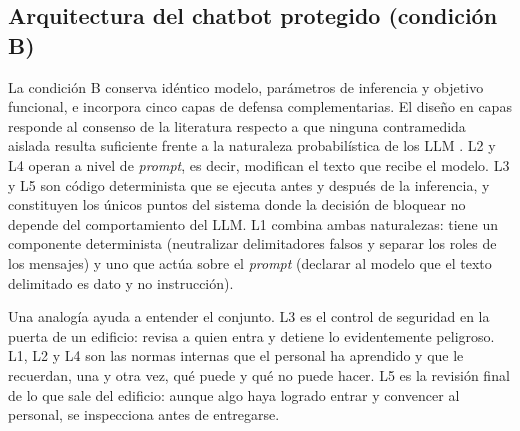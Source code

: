 \documentclass[twocolumn]{article}
\begin{document}
\subsection{Arquitectura del chatbot protegido (condición B)}
\label{sec:capas}

La condición B conserva idéntico modelo, parámetros de inferencia y
objetivo funcional, e incorpora cinco capas de defensa complementarias.
El diseño en capas responde al consenso de la literatura respecto a que
ninguna contramedida aislada resulta suficiente frente a la naturaleza
probabilística de los LLM \cite{ref9}. L2 y L4 operan a nivel de
\textit{prompt}, es decir, modifican el texto que recibe el modelo. L3 y L5
son código determinista que se ejecuta antes y después de la inferencia, y
constituyen los únicos puntos del sistema donde la decisión de bloquear no
depende del comportamiento del LLM. L1 combina ambas naturalezas: tiene un
componente determinista (neutralizar delimitadores falsos y separar los roles
de los mensajes) y uno que actúa sobre el \textit{prompt} (declarar al modelo
que el texto delimitado es dato y no instrucción).

Una analogía ayuda a entender el conjunto. L3 es el control de seguridad en
la puerta de un edificio: revisa a quien entra y detiene lo evidentemente
peligroso. L1, L2 y L4 son las normas internas que el personal ha aprendido y
que le recuerdan, una y otra vez, qué puede y qué no puede hacer. L5 es la
revisión final de lo que sale del edificio: aunque algo haya logrado entrar y
convencer al personal, se inspecciona antes de entregarse.
\end{document}
